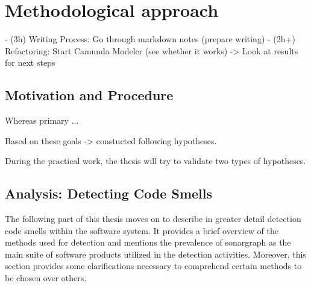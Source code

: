 \chapter{Methodological approach}
- (3h) Writing Process: Go through markdown notes (prepare writing)
- (2h+) Refactoring: Start Camunda Modeler (see whether it works)
	-> Look at results for next steps


\section{Motivation and Procedure}
% 
% 

%
%





Whereas primary ...





Based on these goals -> constucted following hypotheses.

During the practical work, 
	the thesis will try to validate two types of hypotheses.



\section{Analysis: Detecting Code Smells}

The following part of this thesis moves on to describe in greater detail detection code smells within the software system. It provides a brief overview of the methods used for detection and mentions the prevalence of sonargraph as the main suite of software products utilized in the detection activities. Moreover, this section provides some clarifications necessary to comprehend certain methods to be chosen over others.

